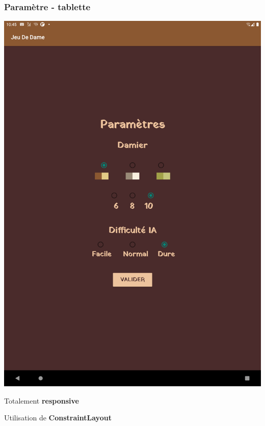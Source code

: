 \documentclass{beamer}
\begin{document}
\begin{frame}
  \frametitle{Paramètre - tablette}

  \begin{center}
    \includegraphics[scale=0.06]{setting_tablet_fr.png}
  \end{center}

  \begin{center}
    Totalement \textbf{responsive}
  
    Utilisation de \textbf{ConstraintLayout}
  \end{center}

\end{frame}
\end{document}
